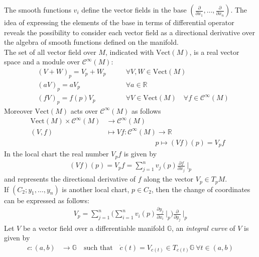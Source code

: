 The smooth functions $v_{i}$ define the vector fields in the base 
$(\frac{\partial}{\partial x_{1}}, \dots ,\frac{\partial}{\partial x_{n}})$. The idea of expressing the elements of the base in terms of differential operator reveals the possibility to consider each vector field as a directional derivative over the algebra of smooth functions defined on the manifold.  \\
The set of all vector field over $M$, indicated with $\text{Vect}(M)$, is a real vector space and a module over $\mathcal{C}^{\infty}(M)$:
\begin{align*}
&(V+W)_{p} = V_{p} + W_{p}  &\qquad \forall V, W \in \text{Vect}(M) \\
&(aV)_{p} = aV_{p} &\qquad \forall a \in \mathbb{R} \\
&(fV)_{p} = f(p)V_{p}  &\qquad \forall V \in \text{Vect}(M) \quad \forall f \in \mathcal{C}^{\infty}(M)
\end{align*}
Moreover $\text{Vect}(M)$ acts over $\mathcal{C}^{\infty}(M)$ as follows
\begin{align*}
\text{Vect}(M) \times \mathcal{C}^{\infty}(M) & \longrightarrow  \mathcal{C}^{\infty}(M) &   \\
(V,f) &\longmapsto  Vf  : \mathcal{C}^{\infty}(M)  \longrightarrow   \mathbb{R} \\
& \qquad \qquad \qquad \quad p \longmapsto (Vf)(p) = V_{p}f
\end{align*}
In the local chart the real number $V_{p}f$ is given by
\begin{align*}
(Vf)(p) = V_{p}f =  \sum_{j=1}^{n}v_{j}(p) \frac{\partial f}{\partial x_{j}}~\Bigr|_{p} 
\end{align*}
and represents the directional derivative of $f$ along the vector $V_{p} \in T_{p}M$.\\
If $(C_{2};y_{1}, \dots , y_{n})$ is another local chart, $p \in C_{2}$, then the change of coordinates can be expressed as follows:
\begin{align*}
V_{p} = \sum_{j=1}^{n} \Big( \sum_{i=1}^{n}v_{i}(p) \frac{\partial y_{j}}{\partial x_{i}}~\Bigr|_{p}  \Big) \frac{\partial }{\partial y_{j}}~\Bigr|_{p}
\end{align*}
Let $V$ be a vector field over a differentiable manifold $\mathbb{G}$, an \emph{integral curve} of $V$ is given by
\begin{align*}
c : (a,b) & \longrightarrow  \mathbb{G}  \quad \text{such that} \quad 
\dot{c}(t) = V_{c(t)} \in T_{c(t)}\mathbb{G} ~\forall t\in (a,b)
\end{align*}
